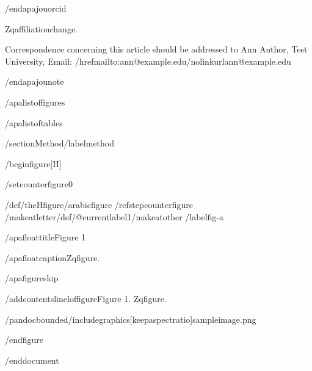 /end{apajouorcid}

Zqaffiliationchange.

Correspondence concerning this article should be addressed to Ann
Author, Test University, Email:
/href{mailto:ann@example.edu}{/nolinkurl{ann@example.edu}}

/end{apajounote}

/apalistoffigures

/apalistoftables

/section{Method}/label{method}

/begin{figure}[H]

/setcounter{figure}{0}

/def/theHfigure{/arabic{figure}}%
/refstepcounter{figure}%
/makeatletter/def/@currentlabel{1}/makeatother%
/label{fig-a}

/apafloattitle{Figure 1}

/apafloatcaption{Zqfigure.}

/apafigureskip

/addcontentsline{lof}{figure}{Figure 1. Zqfigure.}

/pandocbounded{/includegraphics[keepaspectratio]{sampleimage.png}}

/end{figure}




/end{document}
